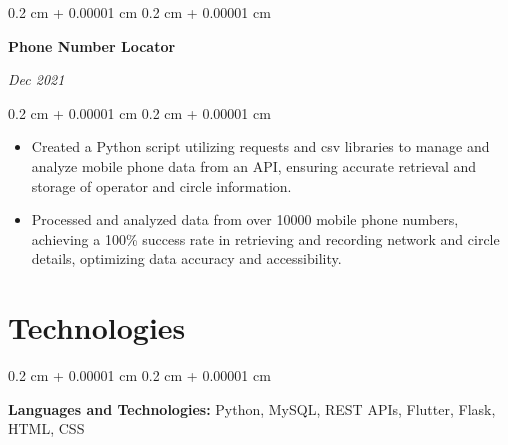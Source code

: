 \documentclass[12pt, letterpaper]{article}
\newenvironment{highlights}{
    \begin{itemize}[
        topsep=0.10 cm,
        parsep=0.10 cm,
        partopsep=0pt,
        itemsep=0pt,
        leftmargin=0.4 cm + 10pt
    ]
}{
    \end{itemize}
} %
\newenvironment{onecolentry}{
    \begin{adjustwidth}{
        0.2 cm + 0.00001 cm
    }{
        0.2 cm + 0.00001 cm
    }
}{
    \end{adjustwidth}
} %
\newenvironment{twocolentry}[2][]{
    \onecolentry
    \def\secondColumn{#2}
    \setcolumnwidth{\fill, 4.5 cm}
    \begin{paracol}{2}
}{
    \switchcolumn \raggedleft \secondColumn
    \end{paracol}
    \endonecolentry
} %
\begin{document}
        \begin{twocolentry}{


        \textit{Dec 2021}}
            \textbf{Phone Number Locator}
        \end{twocolentry}

        \vspace{0.10 cm}
        \begin{onecolentry}
            \begin{highlights}
                \item Created a Python script utilizing requests and csv libraries to manage and analyze mobile phone data from an API, ensuring accurate retrieval and storage of operator and circle information.
                \item Processed and analyzed data from over 10000 mobile phone numbers, achieving a 100\% success rate in retrieving and recording network and circle details, optimizing data accuracy and accessibility.
            \end{highlights}
        \end{onecolentry}



    
    \section{Technologies}



        
        \begin{onecolentry}
            \textbf{Languages and Technologies:} Python, MySQL, REST APIs, Flutter, Flask, HTML, CSS
        \end{onecolentry}


    
\end{document}
